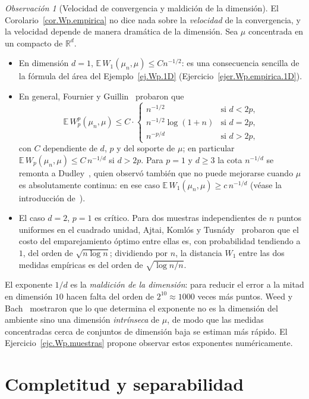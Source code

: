 \documentclass[12pt, a4paper]{amsbook}
\newcommand{\R}{{\mathbb R}}
\newcommand{\E}{{\mathbb E}}
\theoremstyle{remark}
\newtheorem{obs}[teo]{Observación}
\theoremstyle{definition}
\numberwithin{section}{chapter}
\numberwithin{subsection}{section}
\numberwithin{equation}{section}
\numberwithin{figure}{chapter}
\begin{document}
\begin{obs}[Velocidad de convergencia y maldición de la
dimensión]\label{obs.Wp.tasas}
El Corolario~\ref{cor.Wp.empirica} no dice nada sobre la \emph{velocidad} de
la convergencia, y la velocidad depende de manera dramática de la
dimensión. Sea $\mu$ concentrada en un compacto de $\R^d$.
\begin{itemize}
\item En dimensión $d=1$, $\E\,W_1(\mu_n,\mu)\le Cn^{-1/2}$: es una
consecuencia sencilla de la fórmula del área del
Ejemplo~\ref{ej.Wp.1D} (Ejercicio~\ref{ejer.Wp.empirica.1D}).
\item En general, Fournier y Guillin~\cite[Theorem~1]{FournierGuillin2015}
probaron que
\[
\E\,W_p^p(\mu_n,\mu)\le C\cdot
\begin{cases}
n^{-1/2}&\text{si }d<2p,\\
n^{-1/2}\log(1+n)&\text{si }d=2p,\\
n^{-p/d}&\text{si }d>2p,
\end{cases}
\]
con $C$ dependiente de $d$, $p$ y del soporte de $\mu$; en particular
$\E\,W_p(\mu_n,\mu)\le C\,n^{-1/d}$ si $d>2p$. Para $p=1$ y $d\ge3$ la
cota $n^{-1/d}$ se remonta a Dudley~\cite{Dudley1969}, quien observó también
que no puede mejorarse cuando $\mu$ es absolutamente continua: en ese caso
$\E\,W_1(\mu_n,\mu)\ge c\,n^{-1/d}$ (véase la introducción
de~\cite{WeedBach2019}).
\item El caso $d=2$, $p=1$ es crítico. Para dos muestras independientes de
$n$ puntos uniformes en el cuadrado unidad, Ajtai, Komlós y
Tusnády~\cite{AKT1984} probaron que el costo del emparejamiento óptimo entre
ellas es, con probabilidad tendiendo a $1$, del orden de
$\sqrt{n\log n}$; dividiendo por $n$, la distancia $W_1$ entre las dos
medidas empíricas es del orden de $\sqrt{\log n/n}$.
\end{itemize}
El exponente $1/d$ es la \emph{maldición de la dimensión}: para reducir el
error a la mitad en dimensión $10$ hacen falta del orden de $2^{10}\approx1000$
veces más puntos. Weed y Bach~\cite{WeedBach2019} mostraron que lo que
determina el exponente no es la dimensión del ambiente sino una dimensión
\emph{intrínseca} de $\mu$, de modo que las medidas concentradas cerca de
conjuntos de dimensión baja se estiman más rápido. El
Ejercicio~\ref{ejc.Wp.muestras} propone observar estos exponentes
numéricamente.
\end{obs}

\section{Completitud y separabilidad}\label{sec.Wp.completo}
\end{document}
